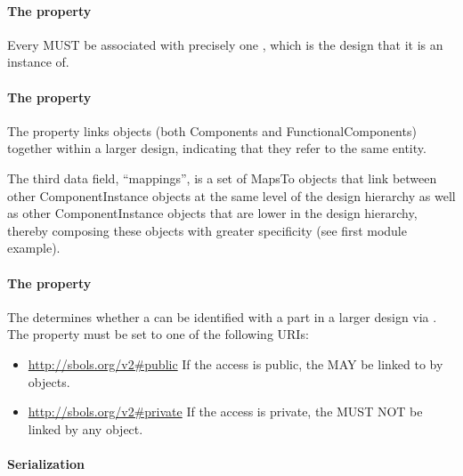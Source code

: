 \paragraph{The  property}
\label{sec:componentDefinition}

Every  MUST be associated with precisely one
, which is the design that it is an instance of.

\paragraph{The  property}
\label{sec:mapsTo}

The  property links  objects (both Components and FunctionalComponents) together within a larger design, indicating that they refer to the same entity.

The third data field, ``mappings'', is a set of MapsTo objects that link between other ComponentInstance objects at the same level of the design hierarchy as well as other ComponentInstance objects that are lower in the design hierarchy, thereby composing these objects with greater specificity (see first module example).

\paragraph{The  property}
\label{sec:access}

The  determines whether a  
can be identified with a part in a larger design via .
The  property must be set to one of the following URIs:

\begin{itemize}
\item \url{http://sbols.org/v2#public}
  If the access is public, the  MAY be linked to by  objects.

\item \url{http://sbols.org/v2#private}
  If the access is private, the  MUST NOT be linked by any  object.
\end{itemize}

\paragraph{Serialization}

